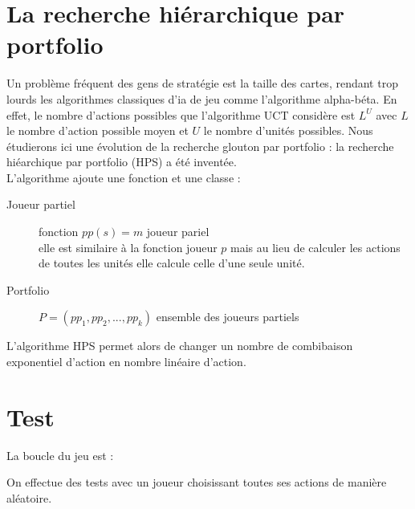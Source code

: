 \documentclass[a4paper, 11pt]{article}
\theoremstyle{definition}
\begin{document}
\section{La recherche hiérarchique par portfolio}
Un problème fréquent des gens de stratégie est la taille des cartes, rendant trop
lourds les algorithmes classiques d'ia de jeu comme l'algorithme alpha-béta. 
En effet, le nombre d'actions possibles que l'algorithme UCT considère est $L^U$
avec $L$ le nombre d'action possible moyen et $U$ le nombre d'unités possibles.
Nous étudierons ici une évolution de la recherche glouton par portfolio : la
recherche hiéarchique par portfolio (HPS) a été inventée.\\
L'algorithme ajoute une fonction et une classe :
\begin{description}
    \item[Joueur partiel] fonction $pp(s) = m$ joueur pariel \\
    elle est similaire à la fonction joueur $p$ mais au lieu de calculer les actions
    de toutes les unités elle calcule celle d'une seule unité.
    \item[Portfolio] $P = (pp_1, pp_2, ..., pp_k)$ ensemble des joueurs partiels
\end{description}
    L'algorithme HPS permet alors de changer un nombre de combibaison exponentiel
d'action en nombre linéaire d'action.

\section{Test}
La boucle du jeu est :
\begin{center}
\end{center}

On effectue des tests avec un joueur choisissant toutes ses actions de manière aléatoire.
\end{document}
